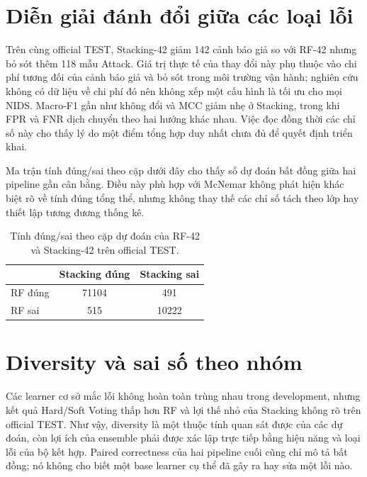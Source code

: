 \section{Diễn giải đánh đổi giữa các loại lỗi}
\label{sec:discussion-error-tradeoff}

Trên cùng official TEST, Stacking-42 giảm 142 cảnh báo giả so với RF-42 nhưng bỏ sót thêm 118 mẫu Attack. Giá trị thực tế của thay đổi này phụ thuộc vào chi phí tương đối của cảnh báo giả và bỏ sót trong môi trường vận hành; nghiên cứu không có dữ liệu về chi phí đó nên không xếp một cấu hình là tối ưu cho mọi NIDS. Macro-F1 gần như không đổi và MCC giảm nhẹ ở Stacking, trong khi FPR và FNR dịch chuyển theo hai hướng khác nhau. Việc đọc đồng thời các chỉ số này cho thấy lý do một điểm tổng hợp duy nhất chưa đủ để quyết định triển khai.

Ma trận tính đúng/sai theo cặp dưới đây cho thấy số dự đoán bất đồng giữa hai pipeline gần cân bằng. Điều này phù hợp với McNemar không phát hiện khác biệt rõ về tính đúng tổng thể, nhưng không thay thế các chỉ số tách theo lớp hay thiết lập tương đương thống kê.

\begin{table}[htbp]
\centering
\small
\renewcommand{\arraystretch}{1.3}
\setlength{\tabcolsep}{14pt}
\caption{Tính đúng/sai theo cặp dự đoán của RF-42 và Stacking-42 trên official TEST.}
\label{tab:paired-correctness}
\begin{tabular}{l S[table-format=5.0] S[table-format=5.0]}
\toprule
 & {Stacking đúng} & {Stacking sai}\\
\midrule
RF đúng & 71104 & 491\\
RF sai & 515 & 10222\\
\bottomrule
\end{tabular}
\end{table}

\section{Diversity và sai số theo nhóm}
\label{sec:discussion-diversity-families}

Các learner cơ sở mắc lỗi không hoàn toàn trùng nhau trong development, nhưng kết quả Hard/Soft Voting thấp hơn RF và lợi thế nhỏ của Stacking không rõ trên official TEST. Như vậy, diversity là một thuộc tính quan sát được của các dự đoán, còn lợi ích của ensemble phải được xác lập trực tiếp bằng hiệu năng và loại lỗi của bộ kết hợp. Paired correctness của hai pipeline cuối cũng chỉ mô tả bất đồng; nó không cho biết một base learner cụ thể đã gây ra hay sửa một lỗi nào.


